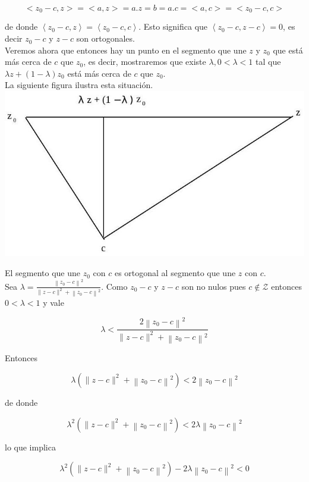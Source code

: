 \documentclass[10pt]{article}
\begin{document}
$$
<z_{0}-c, z>=<a, z>=a . z=b=a . c=<a, c>=<z_{0}-c, c>
$$

de donde $\left\langle z_{0}-c, z\right\rangle=\left\langle z_{0}-c, c\right\rangle$. Esto significa que $\left\langle z_{0}-c, z-c\right\rangle=0$, es decir $z_{0}-c$ y $z-c$ son ortogonales.\\
Veremos ahora que entonces hay un punto en el segmento que une $z$ y $z_{0}$ que está más cerca de $c$ que $z_{0}$, es decir, mostraremos que existe $\lambda, 0<\lambda<1$ tal que $\lambda z+(1-\lambda) z_{0}$ está más cerca de $c$ que $z_{0}$.\\
La siguiente figura ilustra esta situación.\\
\includegraphics[max width=\textwidth, center]{2025_09_05_b12b6a6e1ba506f51b40g-09}

El segmento que une $z_{0}$ con $c$ es ortogonal al segmento que une $z$ con $c$.\\
Sea $\lambda=\frac{\left\|z_{0}-c\right\|^{2}}{\|z-c\|^{2}+\left\|z_{0}-c\right\|^{2}}$. Como $z_{0}-c$ y $z-c$ son no nulos pues $c \notin \mathcal{Z}$ entonces $0<\lambda<1$ y vale

$$
\lambda<\frac{2\left\|z_{0}-c\right\|^{2}}{\|z-c\|^{2}+\left\|z_{0}-c\right\|^{2}}
$$

Entonces

$$
\lambda\left(\|z-c\|^{2}+\left\|z_{0}-c\right\|^{2}\right)<2\left\|z_{0}-c\right\|^{2}
$$

de donde

$$
\lambda^{2}\left(\|z-c\|^{2}+\left\|z_{0}-c\right\|^{2}\right)<2 \lambda\left\|z_{0}-c\right\|^{2}
$$

lo que implica

$$
\lambda^{2}\left(\|z-c\|^{2}+\left\|z_{0}-c\right\|^{2}\right)-2 \lambda\left\|z_{0}-c\right\|^{2}<0
$$
\end{document}
